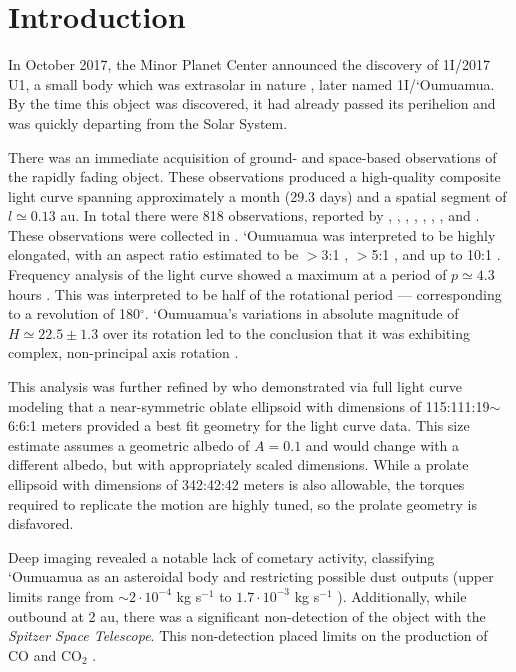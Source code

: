 \documentclass[twocolumn,doublespacing]{aastex631}
\begin{document}

\section{Introduction}

In October 2017, the Minor Planet Center announced the discovery of 1I/2017 U1, a small body which was extrasolar in nature \citep{mpec2017}, later named 1I/‘Oumuamua. By the time this object was discovered, it had already passed its perihelion and was quickly departing from the Solar System. 

There was an immediate acquisition of ground- and space-based observations of the rapidly fading object. These observations produced a high-quality composite light curve spanning approximately a month (29.3 days) and a spatial segment of $l\simeq0.13$ au. In total there were 818 observations, reported by \citet{meech2017}, \citet{bolin2017}, \citet{bannister2017}, \citet{drahus2017}, \citet{fraser2018}, \citet{jewitt2017}, \citet{knight2017}, and \citet{belton2018}. These observations were collected in \citet{belton2018}. `Oumuamua was interpreted to be highly elongated, with an aspect ratio estimated to be $>$3:1 \citep{bolin2017,knight2017}, $>$5:1 \citep{bannister2017,fraser2018,jewitt2017}, and up to 10:1 \citep{meech2017}. Frequency analysis of the light curve showed a maximum at a period of $p\simeq4.3$ hours \citep{belton2018}. This was interpreted to be half of the rotational period --- corresponding to a revolution of 180$^\circ$. `Oumuamua's variations in absolute magnitude of $H\simeq22.5\pm1.3$ over its rotation led to the conclusion that it was exhibiting complex, non-principal axis rotation \citep{drahus2017,meech2017,fraser2018}.

This analysis was further refined by \citet{mashchenko2019} who demonstrated via full light curve modeling that a near-symmetric oblate ellipsoid with dimensions of 115:111:19$\sim$6:6:1 meters provided a best fit geometry for the light curve data. This size estimate assumes a geometric albedo of $A=0.1$ and would change with a different albedo, but with appropriately scaled dimensions. While a prolate ellipsoid with dimensions of 342:42:42 meters is also allowable, the torques required to replicate the motion are highly tuned, so the prolate geometry is disfavored. 

Deep imaging revealed a notable lack of cometary activity, classifying `Oumuamua as an asteroidal body and restricting possible dust outputs (upper limits range from $\sim2\cdot10^{-4}$ kg s$^{-1}$ \citep{jewitt2017} to $1.7\cdot10^{-3}$ kg s$^{-1}$ \citep{meech2017}). Additionally, while outbound at 2 au, there was a significant non-detection of the object with the \textit{Spitzer Space Telescope}. This non-detection placed limits on the production of CO and CO$_2$ \citep{trilling2018}. 
\end{document}
